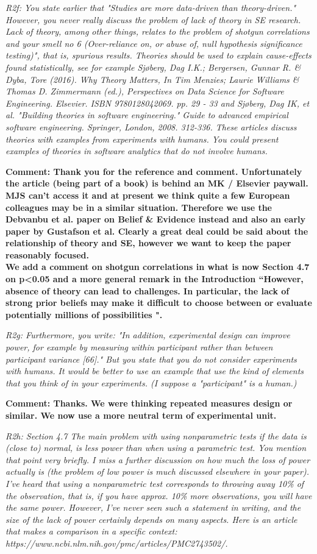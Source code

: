 {\em
R2f:
You state earlier that "Studies are more data-driven than theory-driven." However, you never really discuss the problem of lack of theory in SE research. Lack of theory, among other things, relates to the problem of shotgun correlations and your smell no 6 (Over-reliance on, or abuse of, null hypothesis significance testing)", that is, spurious results. Theories should be used to explain cause-effects found statistically, see for example Sjøberg, Dag I.K.; Bergersen, Gunnar R. & Dyba, Tore (2016). Why Theory Matters, In Tim Menzies; Laurie Williams & Thomas D. Zimmermann (ed.), Perspectives on Data Science for Software Engineering.  Elsevier.  ISBN 9780128042069.  pp. 29 - 33 and Sjøberg, Dag IK, et al. "Building theories in software engineering." Guide to advanced empirical software engineering. Springer, London, 2008. 312-336. These articles discuss theories with examples from experiments with humans. You could present examples of theories in software analytics that do not involve humans.
}

{\bf Comment: Thank you for the reference and comment. Unfortunately the article (being part of a book) is behind an MK / Elsevier paywall.  MJS can't access it and at present we think quite a few European colleagues may be in a similar situation.  Therefore we use the Debvanbu et al. paper on Belief \& Evidence instead and also an early paper by Gustafson et al.  Clearly a great deal could be said about the relationship of theory and SE, however we want to keep the paper reasonably focused.\\
We add a comment on shotgun correlations in what is now Section 4.7 on p<0.05 and a more general remark in the Introduction ``However, absence of theory can lead to challenges.  In particular, the lack of strong prior beliefs may make it difficult to choose between or evaluate potentially millions of possibilities \cite{Gust93,Deva16}".}

{\em
R2g:
Furthermore, you write: "In addition, experimental design can improve power, for example by measuring within participant rather than between participant variance [66]." But you state that you do not consider experiments with humans. It would be better to use an example that use the kind of elements that you think of in your experiments. (I suppose a "participant" is a human.)
}

{\bf Comment: Thanks.  We were thinking repeated measures design or similar.  We now use a more neutral term of experimental unit.}

{\em
R2h:
Section 4.7
The main problem with using nonparametric tests if the data is (close to) normal, is less power than when using a parametric test. You mention that point very briefly. I miss a further discussion on how much the loss of power actually is (the problem of low power is much discussed elsewhere in your paper). I've heard that using a nonparametric test corresponds to throwing away 10\% of the observation, that is, if you have approx. 10\% more observations, you will have the same power. However, I've never seen such a statement in writing, and the size of the lack of power certainly depends on many aspects. Here is an article that makes a comparison in a specific context: https://www.ncbi.nlm.nih.gov/pmc/articles/PMC2743502/.
}

